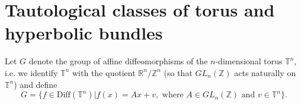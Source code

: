 \documentclass[onecolumn,notitlepage,11pt]{article}
\newcommand{\Z}{\mathbb{Z}}
\newcommand{\R}{\mathbb{R}}
\newcommand{\T}{\mathbb{T}}
\newcommand{\Diff}{\mbox{Diff}}
\newcommand{\beq}{\begin{equation*}}
\newcommand{\eeq}{\end{equation*}}
\theoremstyle{definition}
\begin{document}
%
\section{Tautological classes of torus and hyperbolic bundles}\label{torusbundle}

Let $G$ denote the group of affine diffeomorphisms of the $n$-dimensional
torus $\T^n$, i.e. we identify $\T^n$ with the quotient $\R^n/\Z^n$ (so
that $GL_n(\Z)$ acts naturally on $\T^n$) and define
\beq
G=\{f\in \mbox{Diff}(\T^n)|f(x)=Ax+v,\text{ where }A\in GL_n(\Z)\text{ and }v\in\T^n\}.
\eeq
\end{document}
